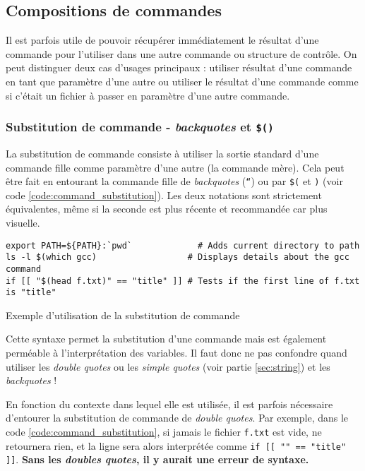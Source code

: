 \subsection{Compositions de commandes} \label{sec:backquotes}


Il est parfois utile de pouvoir récupérer immédiatement le résultat d’une commande pour l’utiliser dans une autre commande ou structure de contrôle. On peut distinguer deux cas d'usages principaux : utiliser résultat d'une commande en tant que paramètre d'une autre ou utiliser le résultat d'une commande comme si c'était un fichier à passer en paramètre d'une autre commande.

\subsubsection{Substitution de commande - \textit{backquotes} et \texttt{\$()}}
La substitution de commande consiste à utiliser la sortie standard d'une commande fille comme paramètre d'une autre (la commande mère).
Cela peut être fait en entourant la commande fille de \textit{backquotes} (\texttt{``}) ou par \texttt{\$(} et \texttt{)} (voir code \ref{code:command_substitution}).
Les deux notations sont strictement équivalentes, même si la seconde est plus récente et recommandée car plus visuelle.

\begin{code}
\begin{verbatim}
export PATH=${PATH}:`pwd`             # Adds current directory to path
ls -l $(which gcc)                  # Displays details about the gcc command
if [[ "$(head f.txt)" == "title" ]] # Tests if the first line of f.txt is "title"
\end{verbatim}
\vspace{-5mm}
\caption{Exemple d'utilisation de la substitution de commande}
    \label{code:command_substitution}
\end{code}

 Cette syntaxe permet la substitution d'une commande mais est également perméable à l'interprétation des variables. Il faut donc ne pas confondre quand utiliser les \textit{double quotes} ou les \textit{simple quotes} (voir partie \ref{sec:string}) et les \textit{backquotes} !

 En fonction du contexte dans lequel elle est utilisée, il est parfois nécessaire d'entourer la substitution de commande de \textit{double quotes}. Par exemple, dans le code \ref{code:command_substitution}, si jamais le fichier \texttt{f.txt} est vide,  ne retournera rien, et la ligne sera alors interprétée comme \texttt{if [[ "" == "title" ]]}. \textbf{Sans les \textit{doubles quotes}, il y aurait une erreur de syntaxe.}

